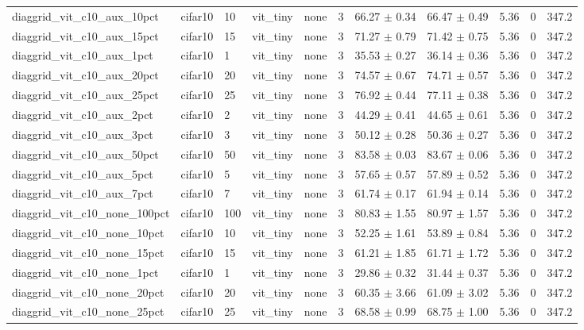 \begin{tabular}{lllllllllll}
diaggrid_vit_c10_aux_10pct & cifar10 & 10 & vit_tiny & none & 3 & 66.27 $\pm$ 0.34 & 66.47 $\pm$ 0.49 & 5.36 & 0 & 347.2 \\
diaggrid_vit_c10_aux_15pct & cifar10 & 15 & vit_tiny & none & 3 & 71.27 $\pm$ 0.79 & 71.42 $\pm$ 0.75 & 5.36 & 0 & 347.2 \\
diaggrid_vit_c10_aux_1pct & cifar10 & 1 & vit_tiny & none & 3 & 35.53 $\pm$ 0.27 & 36.14 $\pm$ 0.36 & 5.36 & 0 & 347.2 \\
diaggrid_vit_c10_aux_20pct & cifar10 & 20 & vit_tiny & none & 3 & 74.57 $\pm$ 0.67 & 74.71 $\pm$ 0.57 & 5.36 & 0 & 347.2 \\
diaggrid_vit_c10_aux_25pct & cifar10 & 25 & vit_tiny & none & 3 & 76.92 $\pm$ 0.44 & 77.11 $\pm$ 0.38 & 5.36 & 0 & 347.2 \\
diaggrid_vit_c10_aux_2pct & cifar10 & 2 & vit_tiny & none & 3 & 44.29 $\pm$ 0.41 & 44.65 $\pm$ 0.61 & 5.36 & 0 & 347.2 \\
diaggrid_vit_c10_aux_3pct & cifar10 & 3 & vit_tiny & none & 3 & 50.12 $\pm$ 0.28 & 50.36 $\pm$ 0.27 & 5.36 & 0 & 347.2 \\
diaggrid_vit_c10_aux_50pct & cifar10 & 50 & vit_tiny & none & 3 & 83.58 $\pm$ 0.03 & 83.67 $\pm$ 0.06 & 5.36 & 0 & 347.2 \\
diaggrid_vit_c10_aux_5pct & cifar10 & 5 & vit_tiny & none & 3 & 57.65 $\pm$ 0.57 & 57.89 $\pm$ 0.52 & 5.36 & 0 & 347.2 \\
diaggrid_vit_c10_aux_7pct & cifar10 & 7 & vit_tiny & none & 3 & 61.74 $\pm$ 0.17 & 61.94 $\pm$ 0.14 & 5.36 & 0 & 347.2 \\
diaggrid_vit_c10_none_100pct & cifar10 & 100 & vit_tiny & none & 3 & 80.83 $\pm$ 1.55 & 80.97 $\pm$ 1.57 & 5.36 & 0 & 347.2 \\
diaggrid_vit_c10_none_10pct & cifar10 & 10 & vit_tiny & none & 3 & 52.25 $\pm$ 1.61 & 53.89 $\pm$ 0.84 & 5.36 & 0 & 347.2 \\
diaggrid_vit_c10_none_15pct & cifar10 & 15 & vit_tiny & none & 3 & 61.21 $\pm$ 1.85 & 61.71 $\pm$ 1.72 & 5.36 & 0 & 347.2 \\
diaggrid_vit_c10_none_1pct & cifar10 & 1 & vit_tiny & none & 3 & 29.86 $\pm$ 0.32 & 31.44 $\pm$ 0.37 & 5.36 & 0 & 347.2 \\
diaggrid_vit_c10_none_20pct & cifar10 & 20 & vit_tiny & none & 3 & 60.35 $\pm$ 3.66 & 61.09 $\pm$ 3.02 & 5.36 & 0 & 347.2 \\
diaggrid_vit_c10_none_25pct & cifar10 & 25 & vit_tiny & none & 3 & 68.58 $\pm$ 0.99 & 68.75 $\pm$ 1.00 & 5.36 & 0 & 347.2 \\

\end{tabular}
